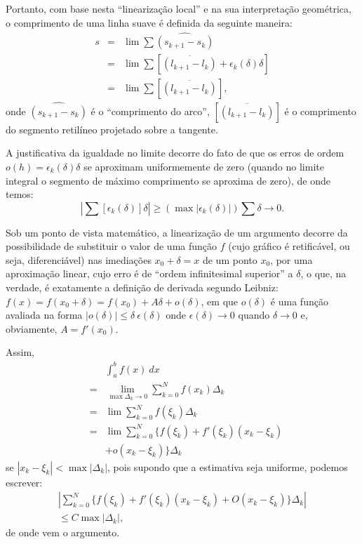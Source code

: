 {Portanto, com base nesta ``linearização local'' e na sua interpretação geométrica, o comprimento de uma linha suave é definida da seguinte maneira:
\[\begin{array}{rcl}
s
&=& \displaystyle \lim \sum \widehat{(s_{k+1}-s_k)} \\
&=& \displaystyle \lim \sum [\overline{(l_{k+1} - l_k)} + \epsilon_k(\delta) \delta] \\
&=& \displaystyle\lim \sum [\overline{(l_{k+1} - l_k)}],
\end{array}\]
onde \(\widehat{(s_{k+1}-s_k)}\) é o ``comprimento do arco'', \([\overline{(l_{k+1} - l_k)}]\) é o comprimento do segmento retilíneo projetado sobre a tangente.

A justificativa da igualdade no limite decorre do fato de que os erros de ordem \(o(h) = \epsilon_k(\delta)\delta\) se aproximam uniformemente de zero (quando no limite integral o segmento de máximo comprimento se aproxima de zero), de onde temos:
\[\left|\displaystyle\sum [\epsilon_k(\delta)]\delta\right|
\ge
\left(\max |\epsilon_k(\delta)| \right) \sum \delta \to 0.\]


Sob um ponto de vista matemático, a linearização de um argumento decorre da possibilidade de substituir o valor de uma função \(f\) (cujo gráfico é retificável, ou seja, diferenciável) nas imediações \(x_0 + \delta = x\) de um ponto \(x_0\), por uma aproximação linear, cujo erro é de ``ordem infinitesimal superior'' a \(\delta\), o que, na verdade, é exatamente a definição de derivada segundo Leibniz: \(f(x) = f(x_0 + \delta) = f(x_0) + A\delta + o(\delta)\), em que \(o(\delta)\) é uma função avaliada na forma \(|o(\delta)| \le \delta\ \epsilon(\delta)\) onde \(\epsilon(\delta) \to 0\) quando \(\delta \to 0\) e, obviamente, \(A = f'(x_0)\).

Assim,
\[\begin{array}{rcl}
& & \displaystyle\int_{a}^{b} f(x)\ dx \\
&=& \displaystyle\lim_{\max \Delta_k \to 0} \sum_{k=0}^{N} f(x_k) \Delta_k \\
&=& \displaystyle\lim \sum_{k=0}^{N} f(\xi_k) \Delta_k \\
&=& \displaystyle\lim \sum_{k=0}^{N} \{f(\xi_k) +f'(\xi_k) (x_k-\xi_k) \\
&& + o(x_k-\xi_k)\} \Delta_k
\end{array}\]
se \(|x_k-\xi_k| < \max|\Delta_k|\), pois supondo que a estimativa seja uniforme, podemos escrever:
\[\begin{array}{l}
\left|\displaystyle \sum_{k=0}^{N} \{f(\xi_k) +f'(\xi_k) (x_k-\xi_k) + O(x_k-\xi_k) \} \Delta_k\right| \\
\le C\max|\Delta_k|,
\end{array}\]
de onde vem o argumento.

}

